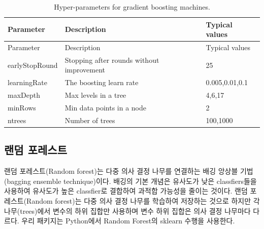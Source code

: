 \documentclass[10.5pt]{book}
\theoremstyle{definition}
\theoremstyle{definition}
\theoremstyle{definition}
\theoremstyle{remark}
\begin{document}
\begin{longtable}[]{@{}lll@{}}
\caption{\label{tab:gbmParameters} Hyper-parameters for gradient boosting
machines.}\tabularnewline
\toprule
Parameter & Description & Typical values\tabularnewline
\midrule
\endfirsthead
\toprule
Parameter & Description & Typical values\tabularnewline
\midrule
\endhead
earlyStopRound & Stopping after rounds without improvement &
25\tabularnewline
learningRate & The boosting learn rate & 0.005,0.01,0.1\tabularnewline
maxDepth & Max levels in a tree & 4,6,17\tabularnewline
minRows & Min data points in a node & 2\tabularnewline
ntrees & Number of trees & 100,1000\tabularnewline
\bottomrule
\end{longtable}

\subsection{랜덤 포레스트}\label{-}

랜덤 포레스트(Random forest)는 다중 의사 결정 나무를 연결하는 배깅
앙상블 기법(bagging ensemble technique)이다. 배깅의 기본 개념은 유사도가
낮은 classfiers들을 사용하여 유사도가 높은 classfier로 결합하여 과적합
가능성을 줄이는 것이다. 랜덤 포레스트(Random forest)는 다중 의사 결정
나무를 학습하여 저장하는 것으로 하지만 각 나무(trees)에서 변수의 하위
집합만 사용하며 변수 하위 집합은 의사 결정 나무마다 다르다. 우리
패키지는 Python에서 Random Forest의 sklearn 수행을 사용한다.
  
\end{document}
